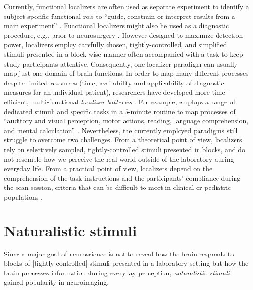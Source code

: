 Currently, functional localizers are often used as separate experiment to
identify a subject-specific functional \acp{roi} to ``guide, constrain or
interpret results from a main experiment'' \citep{saxe2006divide}.
Functional localizers might also be used as a diagnostic procedure, e.g., prior
to neurosurgery \citep[cf.][]{wegrzyn2018thought}.
However designed to maximize detection power, localizers employ carefully
chosen, tightly-controlled, and simplified stimuli presented in a block-wise
manner often accompanied with a task to keep study participants attentive.
Consequently, one localizer paradigm can usually map just one domain of brain
functions.
In order to map many different processes despite limited resources (time,
availability and applicability of diagnostic measures for an individual
patient), researchers have developed more time-efficient, multi-functional
\textit{localizer batteries} \citep[e.g.,][]{barch2013function,
drobyshevsky2006rapid, pinho2018individual, pinho2020individual, pinel2007fast}.
For example, \citet{pinel2007fast} employs a range of dedicated stimuli and
specific tasks in a 5-minute routine to map processes of ``auditory and visual
perception, motor actions, reading, language comprehension, and mental
calculation'' \citep{pinel2007fast}.
Nevertheless, the currently employed paradigms still struggle to overcome two
challenges.
From a theoretical point of view, localizers rely on selectively sampled,
tightly-controlled stimuli presented in blocks, and do not resemble how we
perceive the real world outside of the laboratory during everyday life.
From a practical point of view, localizers depend on the comprehension of the
task instructions and the participants' compliance during the scan session,
criteria that can be difficult to meet in clinical or pediatric populations
\citep{eickhoff2020towards, vanderwal2015inscapes, vanderwal2019movies}.


\section{Naturalistic stimuli}
Since a major goal of neuroscience is not to reveal how the brain
responds to blocks of [tightly-controlled] stimuli presented in a laboratory
setting but how the brain processes information during everyday perception,
\textit{naturalistic stimuli} gained popularity in neuroimaging.

